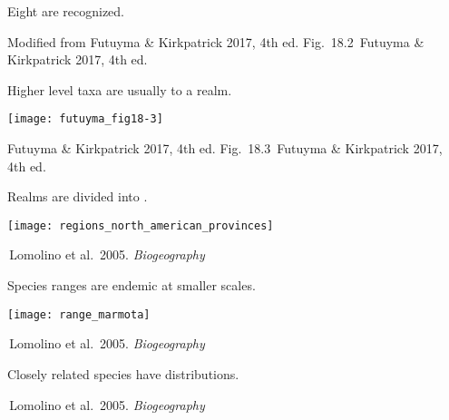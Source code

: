 \documentclass[t]{beamer}
\newcommand{\futuyma}[1]{%
	\ifthenelse{\isempty{#1}}%
	{Futuyma \& Kirkpatrick 2017, 4th ed.}%
	{Fig.~#1~Futuyma \& Kirkpatrick 2017, 4th ed.}%
}
\newcommand{\backskip}{\vspace{-0.5\baselineskip}}
\begin{document}

{
\begin{frame}[b]

\end{frame}
}

{
\begin{frame}{Eight  are recognized.}

\tinyfill Modified from \futuyma{18.2}
\end{frame}
}



\begin{frame}{Higher level taxa are usually  to a realm.}

\backskip

\texttt{[image: futuyma\_fig18-3]}
	

\tinyfill \futuyma{18.3}

\end{frame}


\begin{frame}{Realms are divided into .}

\backskip

\centering

\texttt{[image: regions\_north\_american\_provinces]}
	

\tinyfill \textcopyright\,Lomolino et al.~2005. \emph{Biogeography}

\end{frame}



\begin{frame}{Species ranges are endemic at smaller scales.}

\backskip

\texttt{[image: range\_marmota]}
	

\tinyfill \textcopyright\,Lomolino et al.~2005. \emph{Biogeography}


\end{frame}

%
{
\begin{frame}[t]{Closely related species have  distributions.}

\tinyfill \textcopyright\,Lomolino et al.~2005. \emph{Biogeography}

\end{frame}
}
%
%
\end{document}
